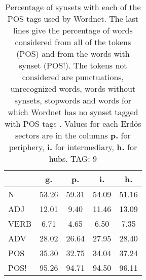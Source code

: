 \begin{table}[h!]
\begin{center}
\begin{tabular}{| l | c | c | c | c |}\hline
 & g. & p. & i. & h. \\\hline
N & 53.26  & 59.31  & 54.09  & 51.16 \\\hline
ADJ & 12.01  & 9.40  & 11.46  & 13.09 \\\hline
VERB & 6.71  & 4.65  & 6.50  & 7.35 \\\hline
ADV & 28.02  & 26.64  & 27.95  & 28.40 \\\hline
POS & 35.30  & 32.75  & 34.04  & 37.24 \\\hline
POS! & 95.26  & 94.71  & 94.50  & 96.11 \\\hline
\end{tabular}
\caption{Percentage of synsets with each of the POS tags used by Wordnet. The last lines give the percentage of words considered from all of the tokens (POS) and from the words with synset (POS!). The tokens not considered are punctuations, unrecognized words, words without synsets, stopwords and words for which Wordnet has no synset  tagged with POS tags . Values for each Erd\"os sectors are in the columns {{\bf p.}} for periphery, {{\bf i.}} for intermediary, {{\bf h.}} for hubs. TAG: 9}
\end{center}
\end{table}